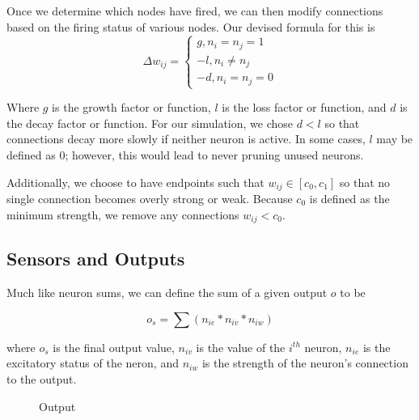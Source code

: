 \documentclass[12pt]{article}
\begin{document}
Once we determine which nodes have fired, we can then modify connections based on the firing status of various nodes.  Our devised formula for this is
$$
\Delta w_{ij} =
\begin{cases}
g, n_i = n_j = 1\\
-l, n_i \neq n_j\\
-d, n_i = n_j = 0
\end{cases}
$$

Where $g$ is the growth factor or function, $l$ is the loss factor or function, and $d$ is the decay factor or function.  For our simulation, we chose $d < l$ so that connections decay more slowly if neither neuron is active.  In some cases, $l$ may be defined as 0; however, this would lead to never pruning unused neurons.

Additionally, we choose to have endpoints such that $w_{ij} \in [c_0, c_1]$ so that no single connection becomes overly strong or weak.  Because $c_0$ is defined as the minimum strength, we remove any connections $w_{ij} < c_0$.

\subsection{Sensors and Outputs} \label{formalio}

Much like neuron sums, we can define the sum of a given output $o$ to be

$$
o_s = \sum (n_{ie} * n_{iv} * n_{iw})
$$

where $o_s$ is the final output value,  $n_{iv}$ is the value of the $i^{th}$ neuron, $n_{ie}$ is the excitatory status of the neron, and $n_{iw}$ is the strength of the neuron's connection to the output.

\begin{figure}[H]
    \centering
    \caption{Output} \label{fig:Output}
\end{figure}
\end{document}
